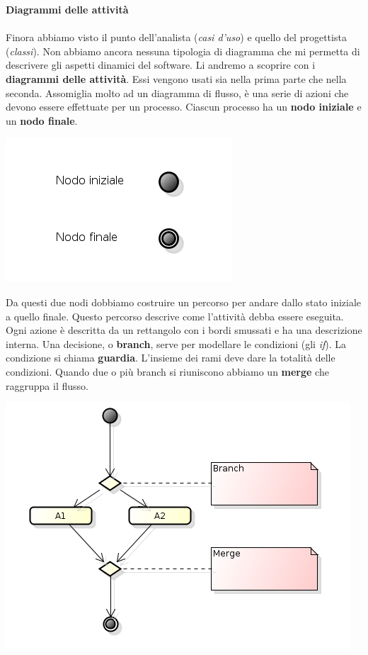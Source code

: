 {\textbf{Diagrammi delle attività}\\\\

Finora abbiamo visto il punto dell'analista (\textit{casi d'uso}) e quello del progettista (\textit{classi}). Non abbiamo ancora nessuna tipologia di diagramma che mi permetta di descrivere gli aspetti dinamici del software. Li andremo a scoprire con i \textbf{diagrammi delle attività}. Essi vengono usati sia nella prima parte che nella seconda. Assomiglia molto ad un diagramma di flusso, è una serie di azioni che devono essere effettuate per un processo. Ciascun processo ha un \textbf{nodo iniziale} e un \textbf{nodo finale}.

\begin{center}

\includegraphics[width=0.75\columnwidth]{img4} %

\end{center}

Da questi due nodi dobbiamo costruire un percorso per andare dallo stato iniziale a quello finale. Questo percorso descrive come l'attività debba essere eseguita. Ogni azione è descritta da un rettangolo con i bordi smussati e ha una descrizione interna. Una decisione, o \textbf{branch}, serve per modellare le condizioni (gli \textit{if}). La condizione si chiama \textbf{guardia}. L'insieme dei rami deve dare la totalità delle condizioni. Quando due o più branch si riuniscono abbiamo un \textbf{merge} che raggruppa il flusso.

\begin{center}

\includegraphics[width=0.75\columnwidth]{img5} %


\end{center}}
